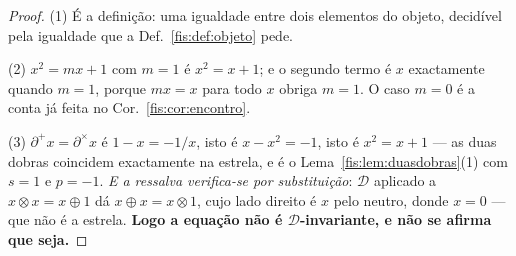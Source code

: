 \documentclass[livro.tex]{subfiles}
\begin{document}
\begin{proof}
(1) É a definição: uma igualdade entre dois elementos do objeto, decidível pela
igualdade que a Def.~\ref{fis:def:objeto} pede.

(2) $x^{2}=mx+1$ com $m=1$ é $x^{2}=x+1$; e o segundo termo é $x$ exactamente
quando $m=1$, porque $mx=x$ para todo $x$ obriga $m=1$. O caso $m=0$ é a conta já
feita no Cor.~\ref{fis:cor:encontro}.

(3) $\partial^{+}x=\partial^{\times}x$ é $1-x=-1/x$, isto é $x-x^{2}=-1$, isto é
$x^{2}=x+1$ --- as duas dobras coincidem exactamente na estrela, e é o
Lema~\ref{fis:lem:duasdobras}(1) com $s=1$ e $p=-1$. \emph{E a ressalva
verifica-se por substituição}: $\mathcal{D}$ aplicado a $x\otimes x=x\oplus1$ dá
$x\oplus x=x\otimes1$, cujo lado direito é $x$ pelo neutro, donde $x=0$ --- que
não é a estrela. \textbf{Logo a equação não é $\mathcal{D}$-invariante, e não se
afirma que seja.}
\end{proof}
\end{document}
